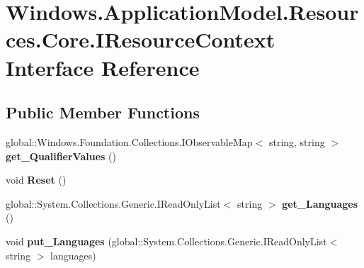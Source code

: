 \hypertarget{interface_windows_1_1_application_model_1_1_resources_1_1_core_1_1_i_resource_context}{}\section{Windows.\+Application\+Model.\+Resources.\+Core.\+I\+Resource\+Context Interface Reference}
\label{interface_windows_1_1_application_model_1_1_resources_1_1_core_1_1_i_resource_context}
\subsection*{Public Member Functions}
\begin{DoxyCompactItemize}
\item 
\mbox{\label{interface_windows_1_1_application_model_1_1_resources_1_1_core_1_1_i_resource_context_a90ec12fc8e5744d350fc3ea54c940698}} 
global\+::\+Windows.\+Foundation.\+Collections.\+I\+Observable\+Map$<$ string, string $>$ {\bfseries get\+\_\+\+Qualifier\+Values} ()
\item 
\mbox{\label{interface_windows_1_1_application_model_1_1_resources_1_1_core_1_1_i_resource_context_ab035b013f5685da0aea1993176acf64c}} 
void {\bfseries Reset} ()
\item 
\mbox{\label{interface_windows_1_1_application_model_1_1_resources_1_1_core_1_1_i_resource_context_ad76a6478d3e3e15758a66c66adf8c42a}} 
global\+::\+System.\+Collections.\+Generic.\+I\+Read\+Only\+List$<$ string $>$ {\bfseries get\+\_\+\+Languages} ()
\item 
\mbox{\label{interface_windows_1_1_application_model_1_1_resources_1_1_core_1_1_i_resource_context_a6f1d9a3b30a2b326bcbad29ebaa379fb}} 
void {\bfseries put\+\_\+\+Languages} (global\+::\+System.\+Collections.\+Generic.\+I\+Read\+Only\+List$<$ string $>$ languages)
\item 
\mbox{\label{interface_windows_1_1_application_model_1_1_resources_1_1_core_1_1_i_resource_context_a90ec12fc8e5744d350fc3ea54c940698}} 

\end{DoxyCompactItemize}
